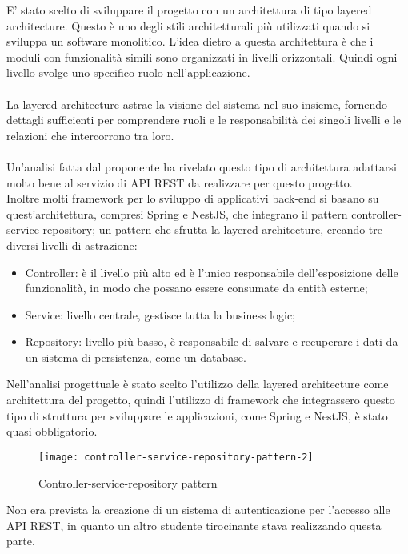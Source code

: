 E' stato scelto di sviluppare il progetto con un architettura di tipo layered architecture. Questo è uno
degli stili architetturali più utilizzati quando si sviluppa un software monolitico. L'idea dietro a 
questa architettura è che i moduli con funzionalità simili sono organizzati in livelli
orizzontali. Quindi ogni livello svolge uno specifico ruolo nell'applicazione.
\\\\
La layered architecture astrae la visione del sistema nel suo insieme, fornendo dettagli 
sufficienti per comprendere ruoli e le responsabilità dei singoli livelli e le relazioni
che intercorrono tra loro.
\\\\
Un'analisi fatta dal proponente ha rivelato questo tipo di architettura adattarsi molto bene al 
servizio di \gls{API} \gls{REST} da realizzare per questo progetto.
\\
Inoltre molti framework per lo sviluppo di applicativi \gls{back-end} si basano su quest'architettura, compresi
Spring e NestJS, che integrano il pattern controller-service-repository; un pattern
che sfrutta la layered architecture, creando tre diversi livelli di astrazione: 
\begin{itemize}
    \item Controller: è il livello più alto ed è l'unico responsabile dell'esposizione delle
        funzionalità, in modo che possano essere consumate da entità esterne;
    \item Service: livello centrale, gestisce tutta la business logic;
    \item Repository: livello più basso, è responsabile di salvare e recuperare i dati da un
        sistema di persistenza, come un database.
\end{itemize}
\leavevmode\newline
Nell'analisi progettuale è stato scelto l'utilizzo della layered architecture come architettura del progetto,
quindi l'utilizzo di framework che integrassero questo tipo di struttura per sviluppare le applicazioni, come 
Spring e NestJS, è stato quasi obbligatorio.
\leavevmode\newline
\begin{figure}[H]
    \centering
    \texttt{[image: controller-service-repository-pattern-2]}
    \caption{Controller-service-repository pattern}
\end{figure}
\leavevmode\newline
Non era prevista la creazione di un sistema di autenticazione per l'accesso alle \gls{API} \gls{REST}, in quanto 
un altro studente tirocinante stava realizzando questa parte.

